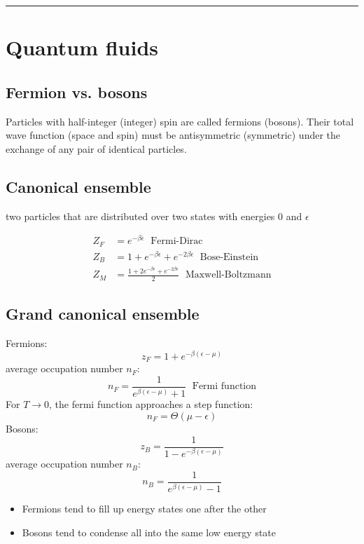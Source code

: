 \noindent\rule[1ex]{\textwidth/5}{1pt}
\section{Quantum fluids}

\subsection*{Fermion vs. bosons}
Particles with half-integer (integer) spin are called fermions (bosons). Their
total wave function (space and spin) must be antisymmetric (symmetric)
under the exchange of any pair of identical particles.

\subsection*{Canonical ensemble}
two particles that are distributed over two states with energies 0 and $\epsilon$

\[
    \begin{aligned}
        Z_F &= e^{-\beta \epsilon} \; \text{ Fermi-Dirac} \\
        Z_B &= 1+ e^{-\beta \epsilon} + e^{-2\beta \epsilon} \; \text{ Bose-Einstein} \\
        Z_M &= \frac{1+ 2e^{-\beta \epsilon} + e^{-2\beta \epsilon}}{2} \; \text{ Maxwell-Boltzmann}
    \end{aligned}
\]

\subsection*{Grand canonical ensemble}
Fermions:
\[
    z_F = 1+e^{-\beta(\epsilon-\mu)}
\]
average occupation number $n_F$:
\[
    n_F = \frac{1}{e^{\beta(\epsilon - \mu)}+1} \; \text{ Fermi function}
\]
For $T \rightarrow 0$, the fermi function approaches a step function:
\[
    n_F = \Theta (\mu - \epsilon)
\]
Bosons:
\[
    z_B = \frac{1}{1-e^{-\beta(\epsilon-\mu)}}
\]
average occupation number $n_B$:
\[
    n_B = \frac{1}{e^{\beta(\epsilon - \mu)}-1}
\]

\begin{itemize}
    \item Fermions tend to fill up energy states one after the other
    \item Bosons tend to condense all into the same low energy state
\end{itemize}

